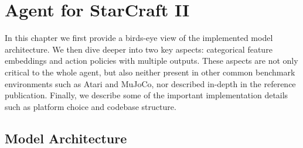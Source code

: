 \chapter{Agent for StarCraft II}

In this chapter we first provide a birds-eye view of the implemented model architecture. We then dive deeper into two key aspects: categorical feature embeddings and action policies with multiple outputs. These aspects are not only critical to the whole agent, but also neither present in other common benchmark environments such as Atari and MuJoCo, nor described in-depth in the reference publication. Finally, we describe some of the important implementation details such as platform choice and codebase structure.

\section{Model Architecture}


